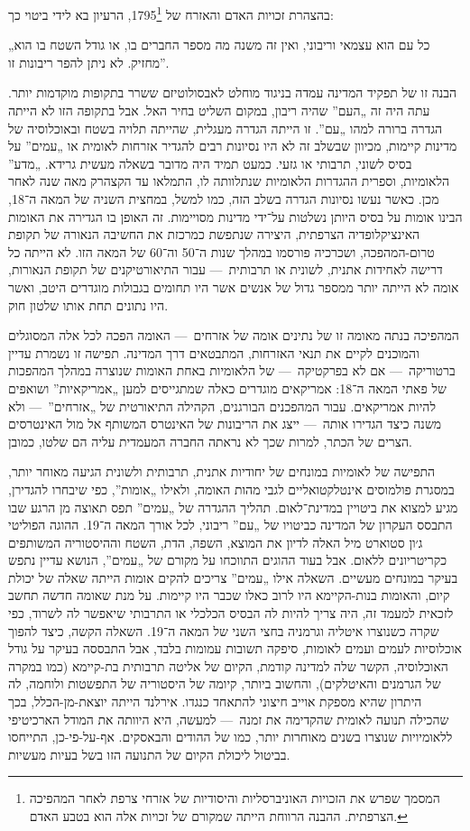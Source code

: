 בהצהרת זכויות האדם והאזרח של 1795\footnote{המסמך שפרש את הזכויות האוניברסליות והיסודיות של אזרחי צרפת לאחר המהפיכה הצרפתית. ההבנה הרווחת הייתה שמקורם של זכויות אלה הוא בטבע האדם.}, הרעיון בא לידי ביטוי כך: 

„כל עם הוא עצמאי וריבוני, ואין זה משנה מה מספר החברים בו, או גודל השטח בו הוא מחזיק. לא ניתן להפר ריבונות זו”.

הבנה זו של תפקיד המדינה עמדה בניגוד מוחלט לאבסולוטיזם ששרר בתקופות מוקדמות יותר. עתה היה זה „העם” שהיה ריבון, במקום השליט בחיר האל. אבל בתקופה הזו לא הייתה הגדרה ברורה למהו „עם”. זו הייתה הגדרה מעגלית, שהייתה תלויה בשטח ובאוכלוסיה של מדינות קיימות, מכיוון שבשלב זה לא היו נסיונות רבים להגדיר אזרחות לאומית או „עמים” על בסיס לשוני, תרבותי או גזעי. כמעט תמיד היה מדובר בשאלה מעשית גרידא. „מדע” הלאומיות, וספרית ההגדרות הלאומיות שנתלוותה לו, התמלאו עד הקצהרק מאה שנה לאחר מכן. כאשר נעשו נסיונות הגדרה בשלב הזה, כמו למשל, במחצית השניה של המאה ה־18, הבינו אומות על בסיס היותן נשלטות על־ידי מדינות מסויימות. זה האופן בו הגדירה את האומות האינציקלופדיה הצרפתית, היצירה שנתפשת כמרכזת את החשיבה הנאורה של תקופת טרום-המהפכה, ושכרכיה פורסמו במהלך שנות ה־50 וה־60 של המאה הזו. לא הייתה כל דרישה לאחידות אתנית, לשונית או תרבותית~— עבור התיאורטיקנים של תקופת הנאורות, אומה לא הייתה יותר ממספר גדול של אנשים אשר היו תחומים בגבולות מוגדרים היטב, ואשר היו נתונים תחת אותו שלטון חוק.

המהפיכה בנתה מאומה זו של נתינים אומה של אזרחים~— האומה הפכה לכל אלה המסוגלים והמוכנים לקיים את תנאי האזרחות, המתבטאים דרך המדינה. תפישה זו נשמרת עדיין ברטוריקה~— אם לא בפרקטיקה~— של הלאומיות באחת האומות שנוצרה במהלך המהפכות של פאתי המאה ה־18: אמריקאים מוגדרים כאלה שמתגייסים למען „אמריקאיות” ושואפים להיות אמריקאים. עבור המהפכנים הבורגנים, הקהילה התיאורטית של „אזרחים”~— ולא משנה כיצד הגדירו אותה~— ייצג את הריבונות של האינטרס המשותף אל מול האינטרסים הצרים של הכתר, למרות שכך לא נראתה החברה המעמדית עליה הם שלטו, כמובן.

התפישה של לאומיות במונחים של יחודיות אתנית, תרבותית ולשונית הגיעה מאוחר יותר, במסגרת פולמוסים אינטלקטואליים לגבי מהות האומה, ולאילו „אומות”, כפי שיבחרו להגדירן, מגיע למצוא את ביטויין במדינת־לאום. תהליך ההגדרה של „עמים” תפס תאוצה מן הרגע שבו התבסס העקרון של המדינה כביטויו של „עם” ריבוני, לכל אורך המאה ה־19. ההוגה הפוליטי ג׳ון סטוארט מיל האלה לדיון את המוצא, השפה, הדת, השטח וההיסטוריה המשותפים כקריטריונים ללאום. אבל בעוד ההוגים התווכחו על מקורם של „עמים”, הנושא עדיין נתפש בעיקר במונחים מעשיים. השאלה אילו „עמים” צריכים להקים אומות הייתה שאלה של יכולת קיום, והאומות בנות-הקיימא היו לרוב כאלו שכבר היו קיימות. על מנת שאומה חדשה תחשב לזכאית למעמד זה, היה צריך להיות לה הבסיס הכלכלי או התרבותי שיאפשר לה לשרוד, כפי שקרה כשנוצרו איטליה וגרמניה בחצי השני של המאה ה־19. השאלה הקשה, כיצד להפוך אוכלוסיות לעמים ועמים לאומות, סיפקה תשובות עמומות בלבד, אבל התבססה בעיקר על גודל האוכלוסיה, הקשר שלה למדינה קודמת, הקיום של אליטה תרבותית בת-קיימא (כמו במקרה של הגרמנים והאיטלקים), והחשוב ביותר, קיומה של היסטוריה של התפשטות ולוחמה, לה היתרון שהיא מספקת אוייב חיצוני להתאחד כנגדו. אירלנד הייתה יוצאת-מן-הכלל, בכך שהכילה תנועה לאומית שהקדימה את זמנה~— למעשה, היא היוותה את המודל הארכיטיפי ללאומיויות שנוצרו בשנים מאוחרות יותר, כמו של ההודים והבאסקים. אף-על-פי-כן, התייחסו בביטול ליכולת הקיום של התנועה הזו בשל בעיות מעשיות.


